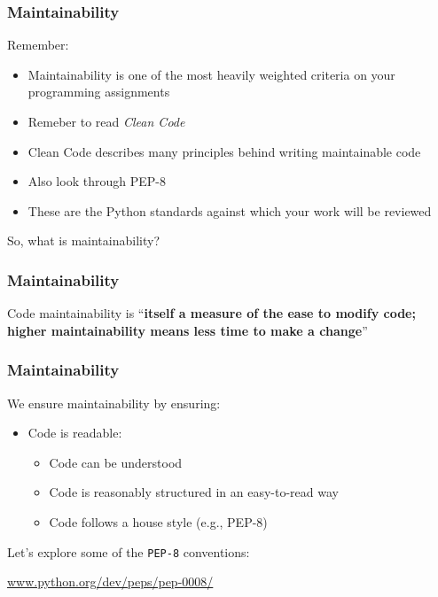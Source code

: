 \begin{frame}[fragile]
	\frametitle{Maintainability}
		
	Remember:

	\begin{itemize}
		\item Maintainability is one of the most heavily weighted criteria on your programming assignments
		\item Remeber to read \textit{Clean Code}
		\item Clean Code describes many principles behind writing maintainable code
		\item Also look through PEP-8
		\item These are the Python standards against which your work will be reviewed
	\end{itemize}
	
	So, what is maintainability?
		
\end{frame}

\begin{frame}[fragile]
	\frametitle{Maintainability}
		
	Code maintainability is ``\textbf{itself a measure of the ease to modify code; higher maintainability means less time to make a change}''
	
\end{frame}

\begin{frame}[fragile]
	\frametitle{Maintainability}
		
	We ensure maintainability by ensuring:
	
	\begin{itemize}
		\item Code is readable:
		\begin{itemize}
			\item Code can be understood
			\item Code is reasonably structured in an easy-to-read way
			\item Code follows a house style (e.g., PEP-8)
		\end{itemize}		
	\end{itemize}
	
	Let's explore some of the \texttt{PEP-8} conventions:
	
	\vspace{1em}
	
	 \url{www.python.org/dev/peps/pep-0008/}
	
\end{frame}

